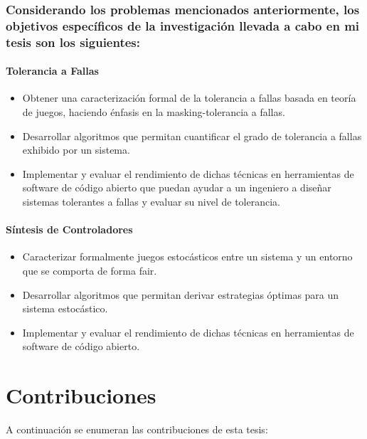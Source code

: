 \subsubsection*{Considerando los problemas mencionados anteriormente, los objetivos específicos de la investigación llevada a cabo en mi tesis son los siguientes:}

\paragraph{Tolerancia a Fallas}
\begin{itemize}
\item Obtener una caracterización formal de la tolerancia a fallas basada en teoría de juegos, haciendo énfasis en la masking-tolerancia a fallas. 
    
\item Desarrollar algoritmos que permitan cuantificar el grado de tolerancia a fallas exhibido por un sistema.

\item Implementar y evaluar el rendimiento de dichas técnicas en herramientas de software de código abierto que puedan ayudar a un ingeniero a diseñar sistemas tolerantes a fallas y evaluar su nivel de tolerancia.
\end{itemize}

\paragraph{Síntesis de Controladores}
\begin{itemize}
\item Caracterizar formalmente juegos estocásticos entre un sistema y un entorno que se comporta de forma fair. 
    
\item Desarrollar algoritmos que permitan derivar estrategias óptimas para un sistema estocástico.

\item Implementar y evaluar el rendimiento de dichas técnicas en herramientas de software de código abierto.
\end{itemize}


\section{Contribuciones}
\label{sec:intro.contribuciones}

A continuación se enumeran las contribuciones de esta tesis:

